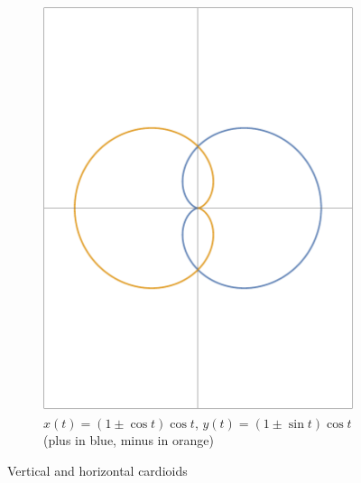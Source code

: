 \documentclass[12pt]{article}
\begin{document}
\begin{figure}[h!]
\begin{subfigure}[t]{0.5\textwidth}
			\includegraphics[scale=0.5125]{6_Limacons3}
			\caption{$x(t)=(1\pm\cos{t})\cos{t}$, 
				$y(t)=(1\pm\sin{t})\cos{t}$\newline(plus in blue, minus in orange)}
		\end{subfigure}
		\caption{Vertical and horizontal cardioids}
		\label{fig:cardioids}
	\end{figure}
\end{document}

